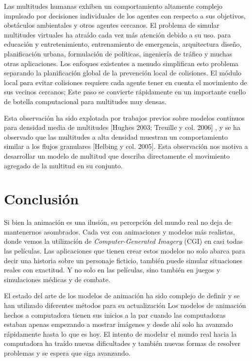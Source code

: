 \documentclass[a4paper,12pt]{report}
\begin{document}
 
Las multitudes humanas exhiben un comportamiento altamente complejo impulsado por decisiones individuales de los agentes con respecto a sus objetivos,
obstáculos ambientales y otros agentes cercanos. El problema de simular multitudes virtuales ha atraído cada vez más atención debido a su uso.
para educación y entretenimiento, entrenamiento de emergencia, arquitectura
diseño, planificación urbana, formulación de políticas, ingeniería de tráfico y muchas otras aplicaciones. Los enfoques existentes a menudo simplifican esto
problema separando la planificación global de la prevención local de colisiones. El módulo local para evitar colisiones requiere cada agente
tener en cuenta el movimiento de sus vecinos cercanos; Este paso
se convierte rápidamente en un importante cuello de botella computacional para multitudes muy densas.\cite{agregate}
 
 
Esta observación ha sido explotada por trabajos previos sobre modelos continuos para densidad media de
multitudes [Hughes 2003\cite{Hughes}; Treuille y col. 2006] \cite{Treuille}, y se ha observado
que las multitudes a alta densidad muestran un comportamiento similar a los flujos granulares
[Helbing y col. 2005].\cite{helbing} Esta observación nos motiva a desarrollar un modelo de multitud que describa directamente el movimiento agregado
de la multitud en su conjunto.
 

\chapter{Conclusión}


Si bien la animación es una ilusión, su percepción del mundo real no deja de mantenernos asombrados. Cada vez con animaciones y modelos más realistas, donde vemos
la utilización de \textit{Computer-Generated Imagery} (CGI) en casi todas las películas. Las aplicaciones que tienen crear estos modelos no solo abarca para decir una historia sobre un personaje ficticio,
también puede simular situaciones reales con exactitud. Y no solo en las películas, sino también en juegos y simulaciones médicas y de combate.
 
 
El estado del arte de los modelos de animación ha sido complejo de definir y se han utilizado diferentes métodos para su actualización\cite{state_of_art}
Los modelos de animación hechos a computadora tienen sus inicios a la par cuando las computadoras estaban apenas empezando a mostrar imágenes y
desde ahí solo ha avanzado rápidamente hasta lo que es hoy.
El intento de modelar el mundo real hacia la computadora ha traído nuevas dificultades y también nuevas formas de resolver problemas y se espera que siga avanzando.
 
\end{document}
